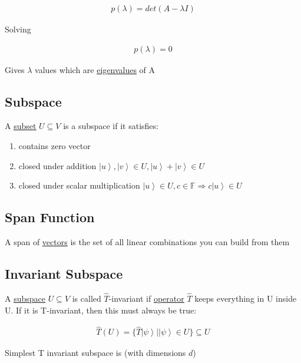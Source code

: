 \documentclass[
]{article}
\providecommand{\tightlist}{%
  \setlength{\itemsep}{0pt}\setlength{\parskip}{0pt}}
\let\oldhyperref\hyperref
\renewcommand{\hyperref}[2][]{\oldhyperref[#1]{\underline{#2}}}
\providecommand{\ket}[1]{\left\lvert #1 \right\rangle}
\providecommand{\Rarr}{\Rightarrow}
\begin{document}
\begin{gather*}
	p(\lambda)=det(A-\lambda I)
\end{gather*}

Solving

\begin{gather*}
	p(\lambda)=0
\end{gather*}

Gives \(\lambda\) values which are \hyperref[eigenvectorseigenvalues]{eigenvalues} of A

\subsection{Subspace}\label{subspaces}

A
\hyperref[subsets]{subset}
\(U\subseteq V\) is a subspace if it satisfies:

\begin{enumerate}
	\def\labelenumi{\arabic{enumi}.}
	\tightlist
	\item
	      contains zero vector
	\item
	      closed under addition \(\ket{u},\ket{v}\in U, \ket{u}+\ket{v}\in U\)
	\item
	      closed under scalar multiplication
	      \(\ket{u}\in U, c\in \mathbb{F}\Rarr c\ket{u}\in U\)
\end{enumerate}

\subsection{Span Function}\label{span-function}

A span of \hyperref[vectors]{vectors} is the set of all linear combinations you can build
from them


\subsection{Invariant Subspace}\label{invariant-subspaces}

A
\hyperref[subspaces]{subspace}
\(U\subseteq V\) is called \(\hat{T}\)-invariant if \hyperref[operators]{operator} \(\hat{T}\)
keeps everything in U inside U. If it is T-invariant, then this must
always be true:

\begin{gather*}
	\hat{T}(U)=\{\hat{T}\ket{\psi}|\ket{\psi}\in U\}\subseteq U
\end{gather*}

Simplest T invariant subspace is (with dimensions \(d\))
\end{document}
